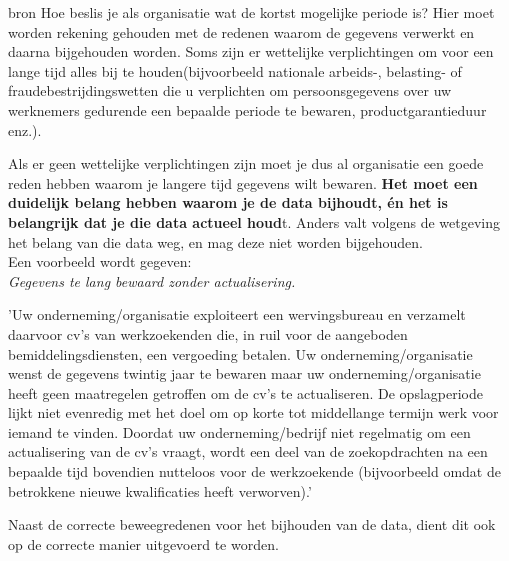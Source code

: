 
bron %
Hoe beslis je als organisatie wat de kortst mogelijke periode is? Hier moet worden rekening gehouden met de redenen waarom de gegevens verwerkt en daarna bijgehouden worden. Soms zijn er wettelijke verplichtingen om voor een lange tijd alles bij te houden(bijvoorbeeld nationale arbeids-, belasting- of fraudebestrijdingswetten die u verplichten om persoonsgegevens over uw werknemers gedurende een bepaalde periode te bewaren, productgarantieduur enz.). 

Als er geen wettelijke verplichtingen zijn moet je dus al organisatie een goede reden hebben waarom je langere tijd gegevens wilt bewaren. \textbf{Het moet een duidelijk belang hebben  waarom je de data bijhoudt, én het is belangrijk dat je die data actueel houd}t. Anders valt volgens de wetgeving het belang van die data weg, en mag deze niet worden bijgehouden. 
\\ Een voorbeeld wordt gegeven: 
\\ \textit{Gegevens te lang bewaard zonder actualisering.}

\setlength{\leftskip}{1cm}
'Uw onderneming/organisatie exploiteert een wervingsbureau en verzamelt daarvoor cv's van werkzoekenden die, in ruil voor de aangeboden bemiddelingsdiensten, een vergoeding betalen. Uw onderneming/organisatie wenst de gegevens twintig jaar te bewaren maar uw onderneming/organisatie heeft geen maatregelen getroffen om de cv’s te actualiseren. De opslagperiode lijkt niet evenredig met het doel om op korte tot middellange termijn werk voor iemand te vinden. Doordat uw onderneming/bedrijf niet regelmatig om een actualisering van de cv’s vraagt, wordt een deel van de zoekopdrachten na een bepaalde tijd bovendien nutteloos voor de werkzoekende (bijvoorbeeld omdat de betrokkene nieuwe kwalificaties heeft verworven).'

\setlength{\leftskip}{0pt}

Naast de correcte beweegredenen voor het bijhouden van de data, dient dit ook op de correcte manier uitgevoerd te worden. 






